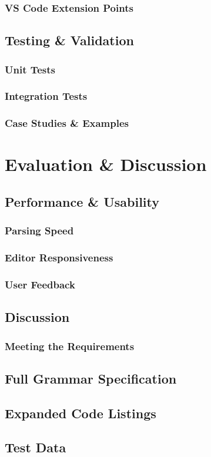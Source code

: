 \documentclass[11pt]{report}
\begin{document}
\section{VS Code Extension Points}

\chapter{Testing \& Validation}
\section{Unit Tests}
\section{Integration Tests}
\section{Case Studies \& Examples}

\part{Evaluation \& Discussion}

\chapter{Performance \& Usability}
\section{Parsing Speed}
\section{Editor Responsiveness}
\section{User Feedback}

\chapter{Discussion}
\section{Meeting the Requirements}

\printbibliography

\appendix

\chapter{Full Grammar Specification}

\chapter{Expanded Code Listings}

\chapter{Test Data}
\end{document}
